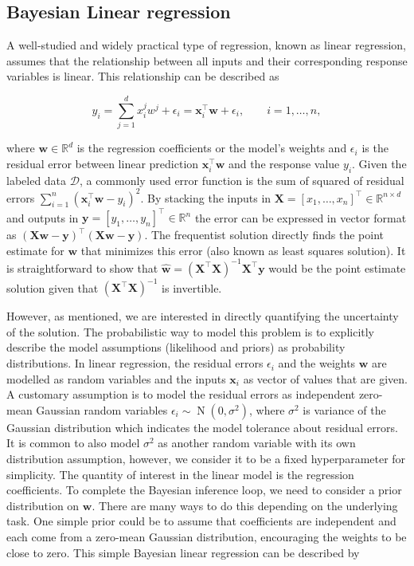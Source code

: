 \documentclass[dissertation,math,vertlayout,pdfa,colorlinks]{aaltoseries}
\newcommand{\bw}{\bm{w}}
\newcommand{\bX}{\bm{X}}
\newcommand{\by}{\bm{y}}
\newcommand{\bD}{\mathcal{D}}
\DeclareMathOperator{\normalpdf}{N}
\newcommand{\tp}{^{\top}}
\begin{document}
\subsection{Bayesian Linear regression}

A well-studied and widely practical type of regression, known as linear regression, assumes that the relationship between all inputs and their corresponding response variables is linear. This relationship can be described as 

\begin{equation*}
y_i= \sum_{j=1}^{d}x_{i}^{j} w^{j}+\epsilon_i=\bm{x}_i\tp\bm{w}+\epsilon_i, \qquad i=1,\ldots,n, 
\end{equation*}

\noindent where $\bm{w} \in \mathbb{R}^d$ is the regression coefficients or the model's weights and $\epsilon_i$ is the residual error between linear prediction $\bm{x}_i\tp\bm{w}$ and the response value $y_i$. Given the labeled data $\bD$, a commonly used error function is the sum of squared of residual errors $\sum_{i=1}^n(\bm{x}_i\tp\bm{w}- y_i)^2$. By stacking the inputs in $\bX = [x_1,\ldots,x_n]\tp \in \mathbb{R}^{n\times d}$ and outputs in $\by = [y_1,\ldots,y_n]\tp \in \mathbb{R}^n$ the error can be expressed in vector format as $(\bX\bm{w}- \by)\tp(\bX\bm{w}- \by)$. The frequentist solution directly finds the point estimate for $\bw$ that minimizes this error (also known as least squares solution). It is straightforward to show that $\hat{\bw} = (\bX \tp \bX)^{-1}\bX\tp \by$  would be the point estimate solution given that $(\bX \tp \bX)^{-1}$ is invertible.  

However, as mentioned, we are interested in directly quantifying the uncertainty of the solution. The probabilistic way to model this problem is to explicitly describe the model assumptions (likelihood and priors) as probability distributions. In linear regression, the residual errors $\epsilon_i$ and the weights $\bm{w}$ are modelled as random variables and the inputs $\bm{x}_i$ as vector of values that are given. A customary assumption is to model the residual errors as independent zero-mean Gaussian random variables $\epsilon_i \sim \normalpdf(0,\sigma^2)$, where $\sigma^2$ is variance of the Gaussian distribution which indicates the model tolerance about residual errors. It is common to also model $\sigma^2$ as another random variable with its own distribution assumption, however, we consider it to be a fixed hyperparameter for simplicity. The quantity of interest in the linear model is the regression coefficients. To complete the Bayesian inference loop, we need to consider a prior distribution on $\bm{w}$. There are many ways to do this depending on the underlying task. One simple prior could be to assume that coefficients are independent and each come from a zero-mean Gaussian distribution, encouraging the weights to be close to zero. This simple Bayesian linear regression can be described by
\end{document}
